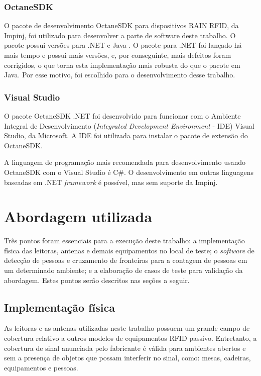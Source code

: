  \subsubsection{OctaneSDK}
 
 O pacote de desenvolvimento OctaneSDK para dispositivos RAIN RFID, da Impinj, foi utilizado para desenvolver a parte de software deste trabalho. O pacote possui versões para .NET e Java \cite{OctaneSDK}. O pacote para .NET foi lançado há mais tempo e possui mais versões, e, por conseguinte, mais defeitos foram corrigidos, o que torna esta implementação mais robusta do que o pacote em Java. Por esse motivo, foi escolhido para o desenvolvimento desse trabalho.
 
 \subsubsection{Visual Studio}
 
 O pacote OctaneSDK .NET foi desenvolvido para funcionar com o Ambiente Integral de Desenvolvimento (\textit{Integrated Development Environment} - IDE) Visual Studio, da Microsoft. A IDE foi utilizada para instalar o pacote de extensão do OctaneSDK. \cite{OctaneSDK}
 
 A linguagem de programação mais recomendada para desenvolvimento usando OctaneSDK com o Visual Studio é C\#. O desenvolvimento em outras linguagens baseadas em .NET \textit{framework} é possível, mas sem suporte da Impinj.

 
 \section{Abordagem utilizada} \label{abordagem}
 
 Três pontos foram essenciais para a execução deste trabalho: a implementação física das leitoras, antenas e demais equipamentos no local de teste; o \textit{software} de detecção de pessoas e cruzamento de fronteiras para a contagem de pessoas em um determinado ambiente;  e a elaboração de casos de teste para  validação da abordagem. Estes pontos serão descritos nas seções a seguir.
 
  
 \subsection{Implementação física}
 
 As leitoras e as antenas utilizadas neste trabalho possuem um grande campo de cobertura relativo a outros modelos de equipamentos RFID passivo. Entretanto, a cobertura de sinal anunciada pelo fabricante é válida para ambientes abertos e sem a presença de objetos que possam interferir no sinal, como: mesas, cadeiras, equipamentos e pessoas.
 
